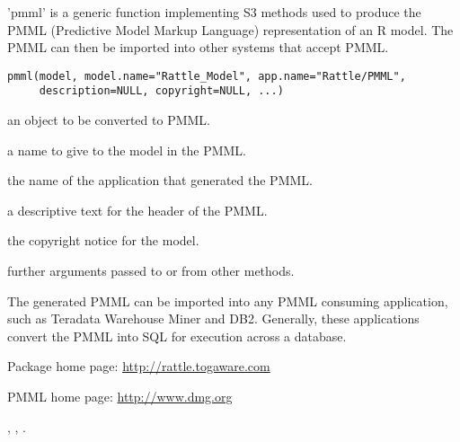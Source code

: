 \begin{Description}\relax
'pmml' is a generic function implementing S3 methods used to produce
the PMML (Predictive Model Markup Language) representation of an R
model.  The PMML can then be imported into other systems that accept
PMML.
\end{Description}
\begin{Usage}
\begin{verbatim}
pmml(model, model.name="Rattle_Model", app.name="Rattle/PMML",
     description=NULL, copyright=NULL, ...)
\end{verbatim}
\end{Usage}
\begin{Arguments}
\begin{ldescription}
\item[\code{model}] an object to be converted to PMML.
\item[\code{model.name}] a name to give to the model in the PMML.
\item[\code{app.name}] the name of the application that generated the PMML.
\item[\code{description}] a descriptive text for the header of the PMML.
\item[\code{copyright}] the copyright notice for the model.
\item[\code{...}] further arguments passed to or from other methods.
\end{ldescription}
\end{Arguments}
\begin{Details}\relax
The generated PMML can be imported into any PMML consuming
application, such as Teradata Warehouse Miner and DB2. Generally,
these applications convert the PMML into SQL for execution across a
database.
\end{Details}
\begin{Author}\relax
{}
\end{Author}
\begin{References}\relax
Package home page: \url{http://rattle.togaware.com}

PMML home page: \url{http://www.dmg.org}
\end{References}
\begin{SeeAlso}\relax
{},
,
.
\end{SeeAlso}

